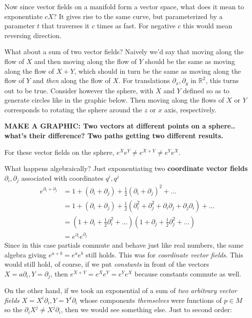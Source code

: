		Now since vector fields on a manifold form a vector space, what does it mean to exponentiate $c X$? It gives rise to the same curve, but parameterized by a parameter $t$ that traverses it $c$ times as fast. For negative $c$ this would mean reversing direction. 
		
		What about a sum of two vector fields? Naively we'd say that moving along the flow of $X$ and then moving along the flow of $Y$ should be the same as moving along the flow of $X+Y$, which should in turn be the same as moving along the flow of $Y$ and \emph{then} along the flow of $X$. For translations $\partial_x, \partial_y$ in $\mathbb R^2$, this turns out to be true. Consider however the sphere, with $X$ and $Y$ defined so as to generate circles like in the graphic below. Then moving along the flows of $X$ or $Y$ corresponds to rotating the sphere around the $z$ or $x$ axis, respectively. 
		
		\textbf{MAKE A GRAPHIC: Two vectors at different points on a sphere.. what's their difference? Two paths getting two different results.}
		
		For these vector fields on the sphere, $e^{X}e^{Y}\neq e^{X+Y} \neq e^Y e^X$. 
		
		What happens algebraically? Just exponentiating two \textbf{coordinate vector fields} $\partial_i, \partial_j$ associated with coordinates $q^i, q^j$
		\begin{align*}
			e^{\partial_i + \partial_j} &= 1 + (\partial_i + \partial_j) + \frac{1}{2}(\partial_i + \partial_j)^2 + \dots\\
			&= 1 + (\partial_i + \partial_j) + \frac{1}{2}(\partial_i^2 + \partial^2_j + \partial_i \partial_j + \partial_j \partial_i) + \dots\\
			&= (1+\partial_i + \frac{1}{2}\partial_i^2+\dots)(1+\partial_j + \frac{1}{2} \partial_j^2+\dots)\\
			&= e^{\partial_i} e^{\partial_j}
		\end{align*}
		Since in this case partials commute and behave just like real numbers, the same algebra giving $e^{a+b} = e^a e^b$ still holds. This was for \emph{coordinate vector fields}. This would still hold, of course, if we put \emph{constants} in front of the vectors $X = a \partial_i, Y=\partial_j$, then $e^{X+Y}=e^X e^Y = e^Y e^X$ because constants commute as well. 
		
		On the other hand, if we took an exponential of a sum of \emph{two arbitrary vector fields} $X=X^i \partial_i, Y = Y^i \partial_i$ whose components \emph{themselves} were functions of $p \in M$ so the $\partial_i X^j \neq X^j \partial_i$, then we would see something else. Just to second order: 
		
